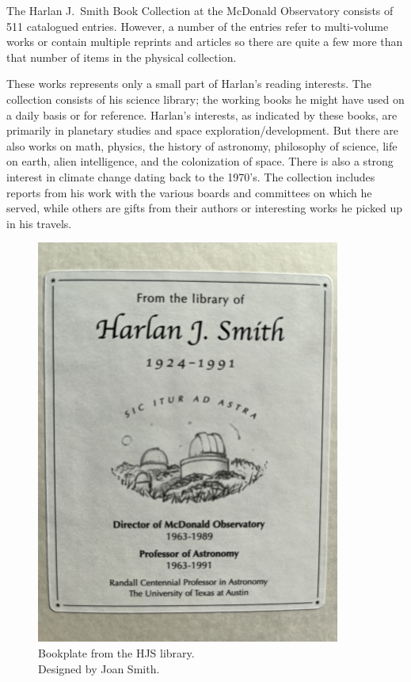 

The Harlan J.~Smith Book Collection at the McDonald Observatory
consists of 511 catalogued entries. However, a number of the entries
refer to multi-volume works or contain multiple reprints and articles
so there are quite a few more than that number of items in the
physical collection.

These works represents only a small part of Harlan's reading
interests.  The collection consists of his science library;
the working books he might have used on a daily basis or for
reference.  Harlan's interests, as indicated by these books, are
primarily in planetary studies and space exploration/development. But
there are also works on math, physics, the history of astronomy,
philosophy of science, life on earth, alien intelligence, and the
colonization of space. There is also a strong interest in climate
change dating back to the 1970's.  The collection includes reports
from his work with the various boards and committees on which he
served, while others are gifts from their authors or interesting
works he picked up in his travels.

\begin{figure}
  \centering
  \includegraphics[height=0.34\textheight]{hjs_bookplate_small.png}\\
  {\small Bookplate from the HJS library.\\Designed by Joan Smith.}
  \label{fig:bookplate}
\end{figure}


